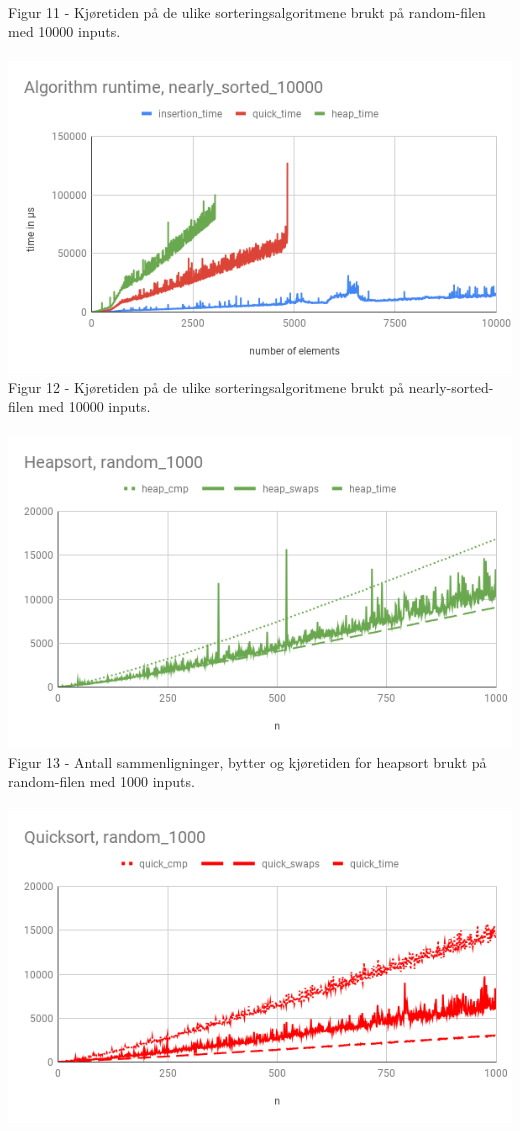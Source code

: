 \documentclass[a4paper, article, oneside, norsk]{memoir} %
\newcommand{\0}{\mathbf{0}}
\newcommand{\1}{\mathbf{1}}
\begin{document}
\\
Figur 11 - Kjøretiden på de ulike sorteringsalgoritmene brukt på random-filen med 10000 inputs.
\\
\\
\includegraphics[scale=0.65]{Algorithm runtime, nearly_sorted_10000.png}
\\
Figur 12 - Kjøretiden på de ulike sorteringsalgoritmene brukt på nearly-sorted-filen med 10000 inputs.
\\
\\
\includegraphics[scale=0.65]{Heapsort.png}
\\
Figur 13 - Antall sammenligninger, bytter og kjøretiden for heapsort brukt på random-filen med 1000 inputs.
\\
\\
\includegraphics[scale=0.65]{Quicksort.png}
\end{document}
